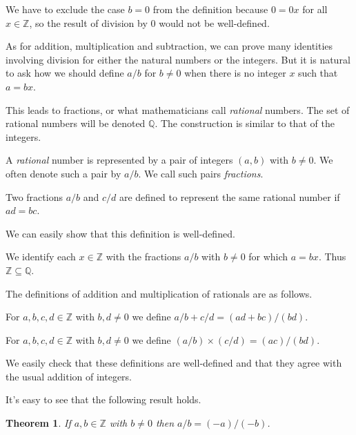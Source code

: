 \documentclass[10pt]{article}
\newcommand{\Z}{\mathbb{Z}}
\newcommand{\Q}{\mathbb{Q}}
\newtheorem{theorem}{Theorem}[section]
\newenvironment{definition}[1][Definition]{\begin{trivlist}
\item[\hskip \labelsep {\bfseries #1}]}{\end{trivlist}}
\begin{document}
We have to exclude the case $b = 0$ from the definition because $0 = 0x$ for all $x \in \Z$, so the result of division by $0$ would not be well-defined.

As for addition, multiplication and subtraction, we can prove many identities involving division for either the natural numbers or the integers. But it is natural to ask how we should define $a/b$ for $b \neq 0$ when there is no integer $x$ such that $a = bx$.

This leads to fractions, or what mathematicians call \emph{rational} numbers. The set of rational numbers will be denoted $\Q$. The construction is similar to that of the integers.

\begin{definition}
A \emph{rational} number is represented by a pair of integers $(a, b)$ with $b \neq 0$. We often denote such a pair by $a/b$. We call such pairs \emph{fractions}.
\end{definition}

\begin{definition}
Two fractions $a/b$ and $c/d$ are defined to represent the same rational number if $ad = bc$.
\end{definition}

We can easily show that this definition is well-defined.

\begin{definition}
We identify each $x \in \Z$ with the fractions $a/b$ with $b \neq 0$ for which $a = bx$. Thus $\Z \subseteq \Q$.
\end{definition}

The definitions of addition and multiplication of rationals are as follows.

\begin{definition}
For $a, b, c, d \in \Z$ with $b, d \neq 0$ we define $a/b + c/d = (ad + bc)/(bd)$.
\end{definition}

\begin{definition}
For $a, b, c, d \in \Z$ with $b, d \neq 0$ we define $(a/b)\times (c/d) = (ac)/(bd)$.
\end{definition}

We easily check that these definitions are well-defined and that they agree with the usual addition of integers.

It's easy to see that the following result holds.

\begin{theorem}
If $a, b \in \Z$ with $b \neq 0$ then $a/b = (-a)/(-b)$.
\end{theorem}
\end{document}
